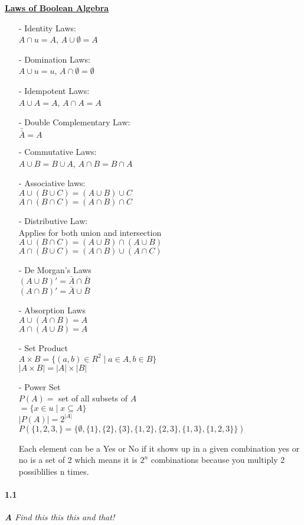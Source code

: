 \documentclass[12pt]{article}
\begin{document}
	 	\begin{flushleft}
	 		\underline{\textbf{Laws of Boolean Algebra}}
	 	\end{flushleft}
	 	
	 	\begin{itemize}
	 		\item[-] Identity Laws: \\
	 		$A \cap u = A$,
	 		$A \cup \emptyset = A$
	 		\item[-] Domination Laws: \\
	 		$A \cup u = u$, $A \cap \emptyset = \emptyset$
	 		\item[-] Idempotent Laws: \\
	 		$A \cup A  = A $, $A \cap A = A$
	 		\item[-] Double Complementary Law: \\
	 		$\bar{\bar{A}} = A $
	 		\item[-] Commutative Laws: \\
	 		$A \cup B = B \cup A$, $A \cap B = B \cap A$
	 		\item[-] Associative laws: \\
	 		$A \cup (B \cup C) = (A \cup B) \cup C$ \\
	 		$A \cap (B \cap C) = (A \cap B) \cap C$
	 		\item[-] Distributive Law: \\
	 		Applies for both union and intersection \\
	 		$A \cup (B \cap C) = (A \cup B) \cap (A \cup B)$ \\
	 		 $A \cap (B\cup C) = (A \cap B) \cup (A \cap C)$
	 		\item[-]De Morgan's Laws \\
	 		$(A \cup B)' = \bar{A} \cap \bar{B}$ \\ 
	 		$(A \cap B)'= \bar{A} \cup \bar{B}$
	 		\item[-] Absorption Laws \\
	 		$A \cup (A \cap B) = A $ \\
	 		$A \cap (A \cup B) = A $
	 		\item[-] Set Product \\
	 		$A \times B = \{(a,b) \in R^2 \mid a \in A, b \in B\}$ \\
	 		$|A \times B| = |A| \times |B| $
	 		
	 		\item[-]Power Set \\
	 		$P(A) = $ set of all subsets of $A$ \\
	 		$= \{x \in u \mid x \subseteq A \}$ \\
	 		$|P(A)| = 2^{|A|}$\\
	 		$P(\{1,2,3,\} = \{\emptyset, \{1\}, \{2\}, \{3\} , \{1,2\} ,\{2,3\} , \{1,3\}  ,\{1,2,3\}   \})$
	 		
	 		Each element can be a Yes or No if it shows up in a given combination yes or no is a set of 2 which means it is $2^n$ combinations because you multiply 2 possiblilies n times.
	 		
 			\end{itemize}
		
		 
		 


	
	\paragraph{1.1}
	\textit{
		\textbf{A}	Find this this this and that!
	}
\end{document}
